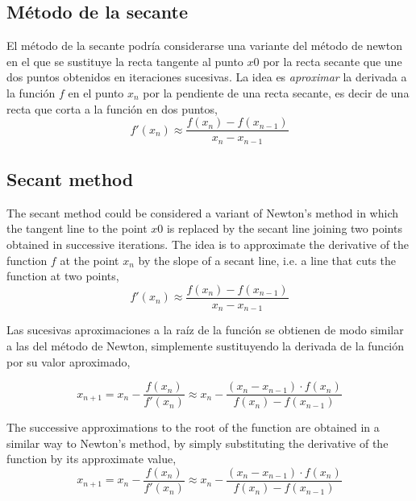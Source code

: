 \begin{paracol}{2}
\switchcolumn

\subsection{Método de la secante}
El método de la secante podría considerarse una variante del método de newton en el que se sustituye la recta tangente al punto $x0$ por la recta secante que une dos puntos obtenidos en iteraciones sucesivas. La idea es \emph{aproximar} la derivada a la función $f$ en el punto $x_n$ por la pendiente de una recta secante, es decir de una recta que corta a la función en dos puntos, 
\begin{equation*}
f'(x_n)\approx \frac{f(x_n)-f(x_{n-1})}{x_n-x_{n-1}}
\end{equation*}

\switchcolumn

\subsection{Secant method}
The secant method could be considered a variant of Newton's method in which the tangent line to the point $x0$ is replaced by the secant line joining two points obtained in successive iterations. The idea is to approximate the derivative of the function $f$ at the point $x_n$ by the slope of a secant line, i.e. a line that cuts the function at two points, 
\begin{equation*}
f'(x_n)\approx \frac{f(x_n)-f(x_{n-1})}{x_n-x_{n-1}}
\end{equation*}

\switchcolumn
Las sucesivas aproximaciones a la raíz de la función se obtienen de modo similar a las del método de Newton, simplemente sustituyendo la derivada de la función por su valor aproximado,

\begin{equation*}
x_{n+1}=x_n-\frac{f(x_n)}{f'(x_n)}\approx x_n-\frac{(x_n-x_{n-1})\cdot f(x_n)}{f(x_n)-f(x_{n-1})}
\end{equation*}

\switchcolumn
The successive approximations to the root of the function are obtained in a similar way to Newton's method, by simply substituting the derivative of the function by its approximate value,
\begin{equation*}
x_{n+1}=x_n-\frac{f(x_n)}{f'(x_n)}\approx x_n-\frac{(x_n-x_{n-1})\cdot f(x_n)}{f(x_n)-f(x_{n-1})}
\end{equation*}

\end{paracol}

